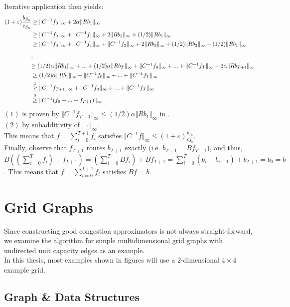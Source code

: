 Iterative application then yields:
\begin{align*}
(1+\varepsilon)\frac{b_{S_0}}{c_{S_0}}&\geq \Vert C^{-1}f_0\Vert_\infty+2\alpha\Vert Rb_1\Vert_\infty\\
&\geq \Vert C^{-1}f_0\Vert_\infty+\Vert C^{-1}f_1\Vert_\infty+2\Vert Rb_{2}\Vert_\infty+(1/2)\Vert Rb_{1}\Vert_\infty\\
&\geq \Vert C^{-1}f_0\Vert_\infty+\Vert C^{-1}f_1\Vert_\infty+\Vert C^{-1}f_2\Vert_\infty+2\Vert Rb_{3}\Vert_\infty+(1/2)\Vert Rb_{2}\Vert_\infty+(1/2)\Vert Rb_{1}\Vert_\infty\\
&\vdots\\
&\mathsmaller{\geq (1/2)\alpha\Vert Rb_1\Vert_\infty+...+(1/2)\alpha\Vert Rb_T\Vert_\infty+\Vert C^{-1}f_0\Vert_\infty+...+\Vert C^{-1}f_T\Vert_\infty+2\alpha\Vert Rb_{T+1}\Vert_\infty}\\
&\geq (1/2)\alpha\Vert Rb_1\Vert_\infty+\Vert C^{-1}f_0\Vert_\infty+...+\Vert C^{-1}f_T\Vert_\infty\\
&\stackrel{1}{\geq} \Vert C^{-1}f_{T+1}\Vert_\infty+\Vert C^{-1}f_0\Vert_\infty+...+\Vert C^{-1}f_T\Vert_\infty\\
&\stackrel{2}{\geq} \Vert C^{-1}(f_0+...+f_{T+1})\Vert_\infty\\
\end{align*}
$(1)$ is proven by $\Vert C^{-1}f_{T+1}\Vert_\infty\leq (1/2)\alpha\Vert Rb_1\Vert_\infty$ in \cite{nmfnlt}.\\
$(2)$ by subadditivity of $\Vert\cdot\Vert_\infty$.\\
This means that $f=\sum_{i=0}^{T+1}f_i$ satisfies $\Vert C^{-1}f\Vert_\infty\leq (1+\varepsilon)\frac{b_{S_0}}{c_{S_0}}$.\\
Finally, observe that $f_{T+1}$ routes $b_{T+1}$ exactly (i.e. $b_{T+1}=Bf_{T+1}$), and thus, $B\left(\left(\sum_{i=0}^T f_i\right) + f_{T+1}\right)=\left(\sum_{i=0}^T Bf_i\right) + Bf_{T+1}=\sum_{i=0}^T (b_i-b_{i+1})+b_{T+1}=b_0=b$. This means that $f=\sum_{i=0}^{T+1}f_i$ satisfies $Bf=b$.
\chapter{Grid Graphs} 
Since constructing good congestion approximators is not always straight-forward, we examine the algorithm for simple multidimensional grid graphs with undirected unit capacity edges as an example. \\
In this thesis, most examples shown in figures will use a $2$-dimensional $4\times4$ example grid.
\section{Graph \& Data Structures}
